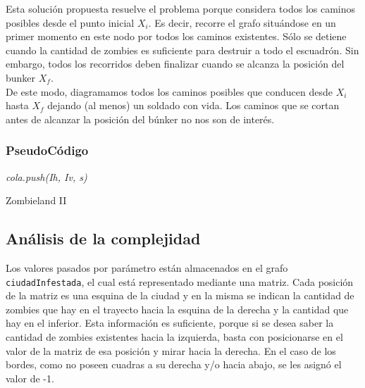 Esta soluci\'on propuesta resuelve el problema porque considera todos los caminos posibles desde el punto inicial $X_i$. Es decir, recorre el grafo situ\'andose en un primer momento en este nodo por todos los caminos existentes. S\'olo se detiene cuando la cantidad de zombies es suficiente para destruir a todo el escuadr\'on. Sin embargo, todos los recorridos deben finalizar cuando se alcanza la posici\'on del bunker $X_f$.\\

De este modo, diagramamos todos los caminos posibles que conducen desde $X_i$ hasta $X_f$ dejando (al menos) un soldado con vida. Los caminos que se cortan antes de alcanzar la posici\'on del b\'unker no nos son de inter\'es.\\

\subsubsection*{PseudoC\'odigo}

\IncMargin{1em}
\begin{algorithm}
\BlankLine
\BlankLine
\emph{cola.push(Ih, Iv, s)}\;
\;

\caption{Zombieland II}%
\end{algorithm}\DecMargin{1em}

\newpage
\subsection{An\'alisis de la complejidad}

Los valores pasados por par\'ametro est\'an almacenados en el grafo \texttt{ciudadInfestada}, el cual est\'a representado mediante una matriz.
Cada posici\'on de la matriz es una esquina de la ciudad y en la misma se indican la cantidad de zombies que hay en el trayecto hacia la esquina de la derecha y la cantidad que hay en el inferior. 
Esta informaci\'on es suficiente, porque si se desea saber la cantidad de zombies existentes hacia la izquierda, basta con posicionarse en el valor de la matriz de esa posici\'on y mirar hacia la derecha.
En el caso de los bordes, como no poseen cuadras a su derecha y/o hacia abajo, se les asign\'o el valor de -1.

